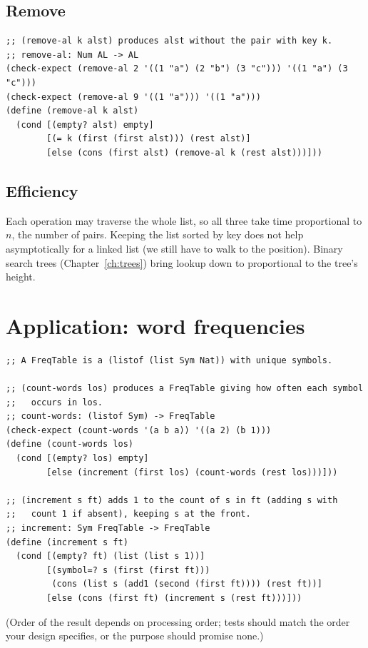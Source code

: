 \subsection{Remove}
\begin{lstlisting}[style=racket]
;; (remove-al k alst) produces alst without the pair with key k.
;; remove-al: Num AL -> AL
(check-expect (remove-al 2 '((1 "a") (2 "b") (3 "c"))) '((1 "a") (3 "c")))
(check-expect (remove-al 9 '((1 "a"))) '((1 "a")))
(define (remove-al k alst)
  (cond [(empty? alst) empty]
        [(= k (first (first alst))) (rest alst)]
        [else (cons (first alst) (remove-al k (rest alst)))]))
\end{lstlisting}

\subsection{Efficiency}
Each operation may traverse the whole list, so all three take time
proportional to $n$, the number of pairs. Keeping the list sorted by key does
not help asymptotically for a linked list (we still have to walk to the
position). Binary search trees (Chapter~\ref{ch:trees}) bring lookup down to
proportional to the tree's height.

\section{Application: word frequencies}
\begin{lstlisting}[style=racket]
;; A FreqTable is a (listof (list Sym Nat)) with unique symbols.

;; (count-words los) produces a FreqTable giving how often each symbol
;;   occurs in los.
;; count-words: (listof Sym) -> FreqTable
(check-expect (count-words '(a b a)) '((a 2) (b 1)))
(define (count-words los)
  (cond [(empty? los) empty]
        [else (increment (first los) (count-words (rest los)))]))

;; (increment s ft) adds 1 to the count of s in ft (adding s with
;;   count 1 if absent), keeping s at the front.
;; increment: Sym FreqTable -> FreqTable
(define (increment s ft)
  (cond [(empty? ft) (list (list s 1))]
        [(symbol=? s (first (first ft)))
         (cons (list s (add1 (second (first ft)))) (rest ft))]
        [else (cons (first ft) (increment s (rest ft)))]))
\end{lstlisting}
(Order of the result depends on processing order; tests should match the
order your design specifies, or the purpose should promise none.)

